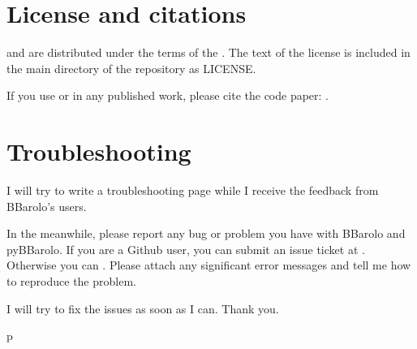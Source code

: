 \documentclass[letterpaper,10pt,english]{sphinxmanual}
\begin{document}
\chapter{License and citations}
\label{\detokenize{license::doc}}\label{\detokenize{license:license-and-citations}}
 and  are distributed under the terms of the . The text of the license is included in the main directory of the repository as LICENSE.

If you use  or  in any published work, please cite the code paper:
.


\chapter{Troubleshooting}
\label{\detokenize{troubleshooting::doc}}\label{\detokenize{troubleshooting:id1}}\label{\detokenize{troubleshooting:troubleshooting}}
I will try to write a troubleshooting page while I receive the feedback from BBarolo’s users.

In the meanwhile, please report any bug or problem you have with BBarolo and pyBBarolo.
If you are a Github user, you can submit an issue ticket at . Otherwise you can . Please attach any significant error messages and tell me how to reproduce the problem.

I will try to fix the issues as soon as I can. Thank you.


\renewcommand{\indexname}{Python Module Index}
\begin{sphinxtheindex}
\def\bigletter#1{{\Large\sffamily#1}\nopagebreak\vspace{1mm}}
\bigletter{p}
\item {}
\end{sphinxtheindex}

\renewcommand{\indexname}{Index}
\printindex
\end{document}
